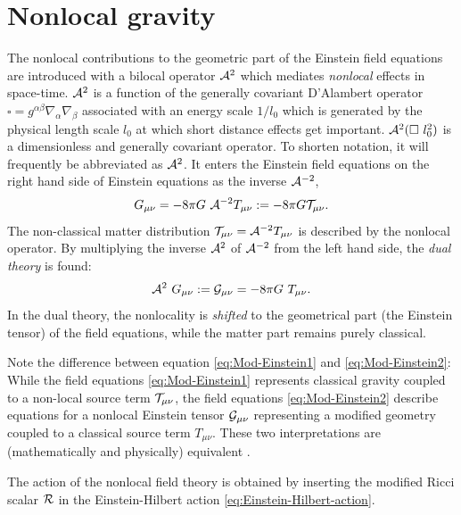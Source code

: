\documentclass[12pt,a4paper]{report}
\numberwithin{equation}{chapter}
\begin{document}
\section{Nonlocal gravity}\label{sec:nonlocal-gravity}
The nonlocal contributions to the geometric part of the Einstein field equations are introduced with a bilocal operator ${\cal A}^2$ which mediates \emph{nonlocal} effects in space-time. ${\cal A}^2$ is a function of the generally covariant D'Alambert operator $\square = g^{\alpha\beta} \nabla_\alpha \nabla_\beta$ associated with an energy scale $1/l_0$ which is generated by the physical length scale $l_0$ at which short distance effects get important. ${\cal A}^2(\square~l_0^2)$ is a dimensionless and generally covariant operator. To shorten notation, it will frequently be abbreviated as ${\cal A}^2$. It enters the Einstein field equations on the right hand side of Einstein equations as the inverse ${\cal A}^{-2}$,
\begin{equation}\label{eq:Mod-Einstein1}
G_{\mu\nu} = -8\pi G~ {\cal A}^{-2} T_{\mu\nu}
:= -8\pi G {\cal T}_{\mu\nu}.
\end{equation}
The non-classical matter distribution ${\cal T}_{\mu\nu} = {\cal A}^{-2} T_{\mu\nu}$ is described by the nonlocal operator. By multiplying the inverse ${\cal A}^{2}$ of ${\cal A}^{-2}$ from the left hand side, the \emph{dual theory} is found:
\begin{equation}\label{eq:Mod-Einstein2}
{\cal A}^2 ~G_{\mu\nu} := {\cal G}_{\mu\nu} = -8\pi G~ T_{\mu\nu}.
\end{equation}
In the dual theory, the nonlocality is \emph{shifted} to the geometrical part (the Einstein tensor) of the field equations, while the matter part remains purely classical.

Note the difference between equation \eqref{eq:Mod-Einstein1} and \eqref{eq:Mod-Einstein2}: While the field equations \eqref{eq:Mod-Einstein1} represents classical gravity coupled to a non-local source term ${\cal T}_{\mu\nu}$, the field equations \eqref{eq:Mod-Einstein2} describe equations for a nonlocal Einstein tensor ${\cal G}_{\mu\nu}$ representing a modified geometry coupled to a classical source term $T_{\mu\nu}$. These two interpretations are (mathematically and physically) equivalent \cite{NFeb2012,MMN2010}.

The action of the nonlocal field theory is obtained by inserting the modified Ricci scalar ${\cal R}$ in the Einstein-Hilbert action \eqref{eq:Einstein-Hilbert-action}.
\end{document}
